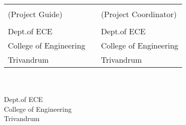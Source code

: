 	
	\begin{singlespace}
		\vspace*{2cm}
		\begin{table}[h!]
			\centering
			\begin{tabular}{p{7cm} p{0.9cm} p{7cm}} 
				\textbf{\guide} && \textbf{\projcordinatorA} \\
				(Project Guide) &&  (Project Coordinator)\\
				\guidedes & & \projcordinatorAdes\\ 
				Dept.of ECE && Dept.of ECE\\ 
				College of Engineering & &College of Engineering\\
				Trivandrum && Trivandrum\\
			\end{tabular}
			
		\end{table}
		
		\vspace*{1.3cm}
		
		\begin{center}
			
			\textbf{\hod} \\ 
			\hoddes\\ 
			Dept.of ECE\\ 
			College of Engineering\\
			Trivandrum\\
			
		\end{center}
	\end{singlespace}
	
	\thispagestyle{empty}



